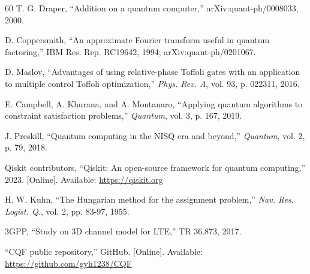 \documentclass[journal]{IEEEtran}
\begin{document}
\begin{thebibliography}{60}
T. G. Draper, ``Addition on a quantum computer,''
arXiv:quant-ph/0008033, 2000.

D. Coppersmith, ``An approximate Fourier transform useful in quantum
factoring,'' IBM Res. Rep. RC19642, 1994; arXiv:quant-ph/0201067.

D. Maslov, ``Advantages of using relative-phase Toffoli gates with
an application to multiple control Toffoli optimization,''
\emph{Phys. Rev. A}, vol. 93, p. 022311, 2016.

E. Campbell, A. Khurana, and A. Montanaro, ``Applying quantum
algorithms to constraint satisfaction problems,'' \emph{Quantum},
vol. 3, p. 167, 2019.

J. Preskill, ``Quantum computing in the NISQ era and beyond,''
\emph{Quantum}, vol. 2, p. 79, 2018.

Qiskit contributors, ``Qiskit: An open-source framework for quantum
computing,'' 2023. [Online]. Available: \url{https://qiskit.org}

H. W. Kuhn, ``The Hungarian method for the assignment problem,''
\emph{Nav. Res. Logist. Q.}, vol. 2, pp. 83-97, 1955.

3GPP, ``Study on 3D channel model for LTE,'' TR 36.873, 2017.


``CQF public repository,'' GitHub. [Online]. Available:
\url{https://github.com/gyh1238/CQF}


\end{thebibliography}
\end{document}

